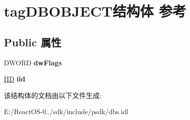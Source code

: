 \hypertarget{structtag_d_b_o_b_j_e_c_t}{}\section{tag\+D\+B\+O\+B\+J\+E\+C\+T结构体 参考}
\label{structtag_d_b_o_b_j_e_c_t}
\subsection*{Public 属性}
\begin{DoxyCompactItemize}
\item 
\mbox{\label{structtag_d_b_o_b_j_e_c_t_a66f2632c033d6a18b90c7645e6d26d32}} 
D\+W\+O\+RD {\bfseries dw\+Flags}
\item 
\mbox{\label{structtag_d_b_o_b_j_e_c_t_a300779a188912fb5a36b9f3c137d2226}} 
\hyperlink{struct___i_i_d}{I\+ID} {\bfseries iid}
\end{DoxyCompactItemize}


该结构体的文档由以下文件生成\+:\begin{DoxyCompactItemize}
\item 
E\+:/\+React\+O\+S-\/0../sdk/include/psdk/dbs.\+idl\end{DoxyCompactItemize}
